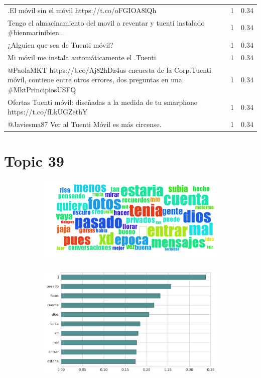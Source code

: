 \begin{longtable}{p{12.5cm}rr}
.El móvil sin el móvil https://t.co/oFGIOA8lQh & 1 & 0.34 \\
Tengo el almacinamiento del movil a reventar y tuenti instalado \#bienmarinibien... & 1 & 0.34 \\
¿Alguien que sea de Tuenti móvil? & 1 & 0.34 \\
Mi móvil me instala automáticamente el .Tuenti & 1 & 0.34 \\
@PaolaMKT https://t.co/Aj82hDz4us encuesta de la Corp.Tuenti móvil, contiene entre otros errores, dos preguntas en una. \#MktPrincipiosUSFQ & 1 & 0.34 \\
Ofertas Tuenti móvil: diseñadas a la medida de tu smarphone https://t.co/fLkUGZethY & 1 & 0.34 \\
@Javiesma87 Ver al Tuenti Móvil es más circense. & 1 & 0.34 \\

\end{longtable}
\clearpage

\section{Topic 39}

\begin{figure}[htbp!]
    \centering
    \begin{subfigure}[b]{0.49\textwidth}
        \includegraphics[width=\textwidth]{twitter_all/report_images/topic-39-wordcloud.jpg}
    \end{subfigure}
    \begin{subfigure}[b]{0.49\textwidth}
        \includegraphics[width=\textwidth]{twitter_all/report_images/topic-39-terms.jpg}
    \end{subfigure}
\end{figure}


